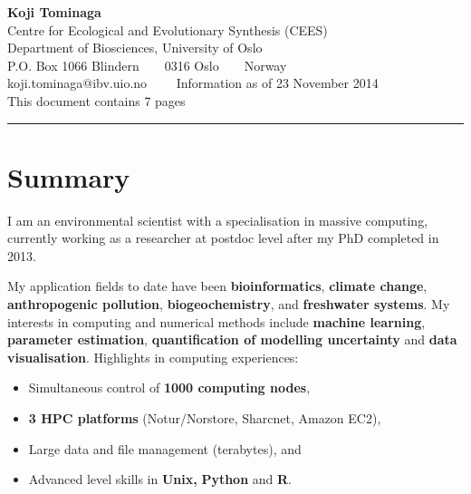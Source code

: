 \documentclass[11pt, a4paper]{article}
\begin{document}
\selectfont


\begin{center} {\LARGE \textbf{Koji Tominaga}}
  \\
  Centre for Ecological and Evolutionary Synthesis (CEES)\\
  Department of Biosciences, University of Oslo\\
  P.O. Box 1066 Blindern\ \ \textbullet \ \ 0316 Oslo\ \ \textbullet \
  \ Norway
  \\
  koji.tominaga@ibv.uio.no \ \ \textbullet \ \ Information as of 23
  November 2014 
  \\
  This document contains 7 pages
\end{center}

\hrule
\vspace{-0.4em}



\section*{Summary}
I am an environmental scientist with a specialisation in massive
computing, currently working as a researcher at postdoc level after my
PhD completed in 2013.

My application fields to date have been \textbf{bioinformatics},
\textbf{climate change}, \textbf{anthropogenic pollution},
\textbf{biogeochemistry}, and \textbf{freshwater systems}. My
interests in computing and numerical methods include \textbf{machine
  learning}, \textbf{parameter estimation}, \textbf{quantification of
  modelling uncertainty} and \textbf{data visualisation}. Highlights
in computing experiences:
\begin{itemize}
  \itemsep-0.1em
\item Simultaneous control of \textbf{1000 computing nodes},
\item \textbf{3 HPC platforms} (Notur/Norstore, Sharcnet, Amazon EC2),
\item Large data and file management (terabytes), and
\item Advanced level skills in \textbf{Unix,} \textbf{Python} and
  \textbf{R}.
\end{itemize}









\end{document}
